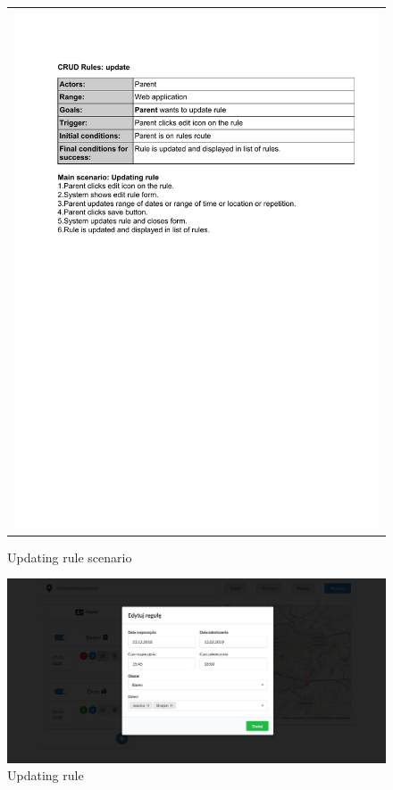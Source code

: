 \documentclass{sprawozdanie-agh}
\begin{document}
		\begin{figure}[H] 
			\centering
			\begin{tabular}{c}
				\includegraphics[width=.80\textwidth]{upR_cropped} 
			\end{tabular} 
		\caption{Updating rule scenario}
		\end{figure}

		\begin{figure}[H]
			\centering
			\includegraphics[width=.80\textwidth]{editRule}
			\caption{Updating rule}
		\end{figure}
\end{document}
